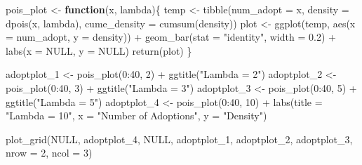 \documentclass[
]{article}
\newenvironment{Shaded}{\begin{snugshade}}{\end{snugshade}}
\newcommand{\AttributeTok}[1]{\textcolor[rgb]{0.77,0.63,0.00}{#1}}
\newcommand{\ConstantTok}[1]{\textcolor[rgb]{0.00,0.00,0.00}{#1}}
\newcommand{\ControlFlowTok}[1]{\textcolor[rgb]{0.13,0.29,0.53}{\textbf{#1}}}
\newcommand{\DecValTok}[1]{\textcolor[rgb]{0.00,0.00,0.81}{#1}}
\newcommand{\FloatTok}[1]{\textcolor[rgb]{0.00,0.00,0.81}{#1}}
\newcommand{\FunctionTok}[1]{\textcolor[rgb]{0.00,0.00,0.00}{#1}}
\newcommand{\NormalTok}[1]{#1}
\newcommand{\OtherTok}[1]{\textcolor[rgb]{0.56,0.35,0.01}{#1}}
\newcommand{\SpecialCharTok}[1]{\textcolor[rgb]{0.00,0.00,0.00}{#1}}
\newcommand{\StringTok}[1]{\textcolor[rgb]{0.31,0.60,0.02}{#1}}
\begin{document}
\begin{Shaded}
\begin{Highlighting}[]
\NormalTok{pois\_plot }\OtherTok{\textless{}{-}} \ControlFlowTok{function}\NormalTok{(x, lambda)\{}
\NormalTok{  temp }\OtherTok{\textless{}{-}} \FunctionTok{tibble}\NormalTok{(}\AttributeTok{num\_adopt =}\NormalTok{ x,}
                 \AttributeTok{density =} \FunctionTok{dpois}\NormalTok{(x, lambda),}
                 \AttributeTok{cume\_density =} \FunctionTok{cumsum}\NormalTok{(density))}
\NormalTok{  plot }\OtherTok{\textless{}{-}} \FunctionTok{ggplot}\NormalTok{(temp, }\FunctionTok{aes}\NormalTok{(}\AttributeTok{x =}\NormalTok{ num\_adopt, }\AttributeTok{y =}\NormalTok{ density)) }\SpecialCharTok{+}
    \FunctionTok{geom\_bar}\NormalTok{(}\AttributeTok{stat =} \StringTok{"identity"}\NormalTok{, }\AttributeTok{width =} \FloatTok{0.2}\NormalTok{) }\SpecialCharTok{+}
    \FunctionTok{labs}\NormalTok{(}\AttributeTok{x =} \ConstantTok{NULL}\NormalTok{, }\AttributeTok{y =} \ConstantTok{NULL}\NormalTok{)}
  \FunctionTok{return}\NormalTok{(plot)}
\NormalTok{\}}

\NormalTok{adoptplot\_1 }\OtherTok{\textless{}{-}} \FunctionTok{pois\_plot}\NormalTok{(}\DecValTok{0}\SpecialCharTok{:}\DecValTok{40}\NormalTok{, }\DecValTok{2}\NormalTok{) }\SpecialCharTok{+}
  \FunctionTok{ggtitle}\NormalTok{(}\StringTok{"Lambda = 2"}\NormalTok{)}
\NormalTok{adoptplot\_2 }\OtherTok{\textless{}{-}} \FunctionTok{pois\_plot}\NormalTok{(}\DecValTok{0}\SpecialCharTok{:}\DecValTok{40}\NormalTok{, }\DecValTok{3}\NormalTok{) }\SpecialCharTok{+}
  \FunctionTok{ggtitle}\NormalTok{(}\StringTok{"Lambda = 3"}\NormalTok{)}
\NormalTok{adoptplot\_3 }\OtherTok{\textless{}{-}} \FunctionTok{pois\_plot}\NormalTok{(}\DecValTok{0}\SpecialCharTok{:}\DecValTok{40}\NormalTok{, }\DecValTok{5}\NormalTok{) }\SpecialCharTok{+}
  \FunctionTok{ggtitle}\NormalTok{(}\StringTok{"Lambda = 5"}\NormalTok{)}
\NormalTok{adoptplot\_4 }\OtherTok{\textless{}{-}} \FunctionTok{pois\_plot}\NormalTok{(}\DecValTok{0}\SpecialCharTok{:}\DecValTok{40}\NormalTok{, }\DecValTok{10}\NormalTok{) }\SpecialCharTok{+}
  \FunctionTok{labs}\NormalTok{(}\AttributeTok{title =} \StringTok{"Lambda = 10"}\NormalTok{, }\AttributeTok{x =} \StringTok{"Number of Adoptions"}\NormalTok{, }\AttributeTok{y =} \StringTok{"Density"}\NormalTok{)}

\FunctionTok{plot\_grid}\NormalTok{(}\ConstantTok{NULL}\NormalTok{, adoptplot\_4, }\ConstantTok{NULL}\NormalTok{, adoptplot\_1, adoptplot\_2, adoptplot\_3, }\AttributeTok{nrow =} \DecValTok{2}\NormalTok{, }\AttributeTok{ncol =} \DecValTok{3}\NormalTok{)}
\end{Highlighting}
\end{Shaded}
\end{document}
